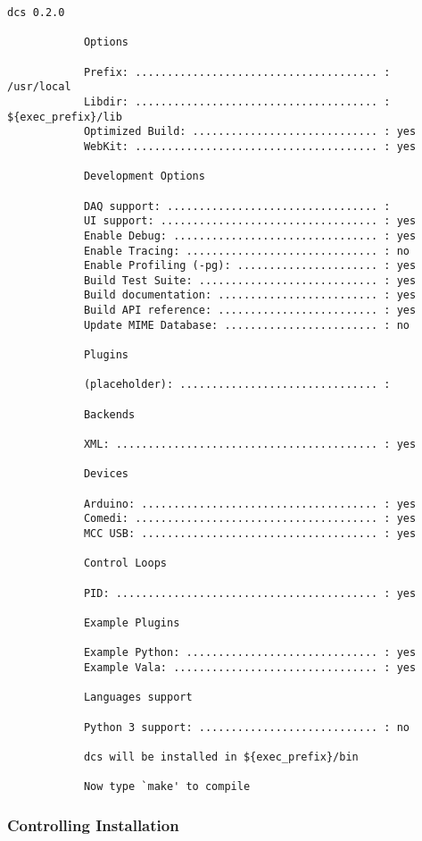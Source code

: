     \begin{lstlisting}[caption={Compiling OpenDCS},
                       label={lst:inst-comp}]
			dcs 0.2.0

			Options

			Prefix: ...................................... : /usr/local
			Libdir: ...................................... : ${exec_prefix}/lib
			Optimized Build: ............................. : yes
			WebKit: ...................................... : yes

			Development Options

			DAQ support: ................................. :
			UI support: .................................. : yes
			Enable Debug: ................................ : yes
			Enable Tracing: .............................. : no
			Enable Profiling (-pg): ...................... : yes
			Build Test Suite: ............................ : yes
			Build documentation: ......................... : yes
			Build API reference: ......................... : yes
			Update MIME Database: ........................ : no

			Plugins

			(placeholder): ............................... :

			Backends

			XML: ......................................... : yes

			Devices

			Arduino: ..................................... : yes
			Comedi: ...................................... : yes
			MCC USB: ..................................... : yes

			Control Loops

			PID: ......................................... : yes

			Example Plugins

			Example Python: .............................. : yes
			Example Vala: ................................ : yes

			Languages support

			Python 3 support: ............................ : no

			dcs will be installed in ${exec_prefix}/bin

			Now type `make' to compile
    \end{lstlisting}

    \subsubsection{Controlling Installation}\label{sec:inst-comp-control}

